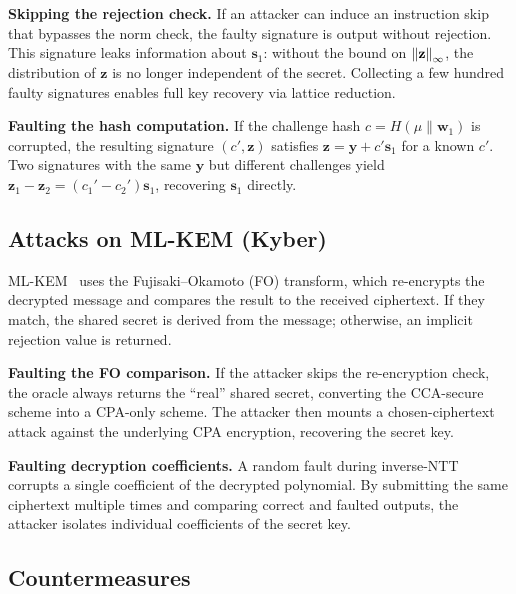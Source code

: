 \textbf{Skipping the rejection check.}  If an attacker can induce an instruction skip that bypasses the norm check, the faulty signature is output without rejection.  This signature leaks information about $\mathbf{s}_1$: without the bound on $\left\lVert \mathbf{z} \right\rVert_\infty$, the distribution of $\mathbf{z}$ is no longer independent of the secret.  Collecting a few hundred faulty signatures enables full key recovery via lattice reduction.

\textbf{Faulting the hash computation.}  If the challenge hash $c = H(\mu \| \mathbf{w}_1)$ is corrupted, the resulting signature $(c', \mathbf{z})$ satisfies $\mathbf{z} = \mathbf{y} + c'\mathbf{s}_1$ for a known $c'$.  Two signatures with the same $\mathbf{y}$ but different challenges yield $\mathbf{z}_1 - \mathbf{z}_2 = (c_1' - c_2')\mathbf{s}_1$, recovering $\mathbf{s}_1$ directly.

\subsection{Attacks on ML-KEM (Kyber)}
\label{subsec:fault-kyber}

ML-KEM~\cite{FIPS203} uses the Fujisaki--Okamoto (FO) transform, which re-encrypts the decrypted message and compares the result to the received ciphertext.  If they match, the shared secret is derived from the message; otherwise, an implicit rejection value is returned.

\textbf{Faulting the FO comparison.}  If the attacker skips the re-encryption check, the oracle always returns the ``real'' shared secret, converting the CCA-secure scheme into a CPA-only scheme.  The attacker then mounts a chosen-ciphertext attack against the underlying CPA encryption, recovering the secret key.

\textbf{Faulting decryption coefficients.}  A random fault during inverse-NTT corrupts a single coefficient of the decrypted polynomial.  By submitting the same ciphertext multiple times and comparing correct and faulted outputs, the attacker isolates individual coefficients of the secret key.

\subsection{Countermeasures}
\label{subsec:fault-countermeasures}

